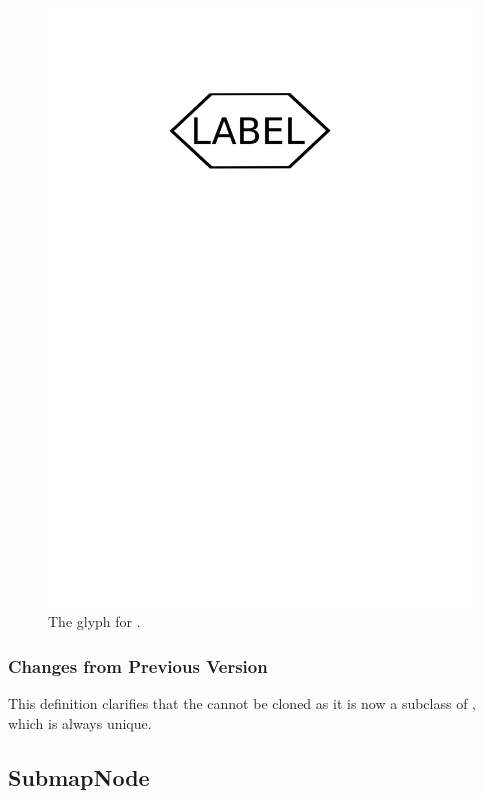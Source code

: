 \begin{figure}[H]
  \centering
  \includegraphics[scale = 0.3]{images/phenotype}
  \caption{The \PD glyph for .}
  \label{fig:phenotype}
\end{figure}


\subsubsection{Changes from Previous Version}

This definition clarifies that the  cannot be
cloned as it is now a subclass of , which is always
unique.


\subsection{SubmapNode}
\label{sec:submap}\label{defn:SubmapNode}

